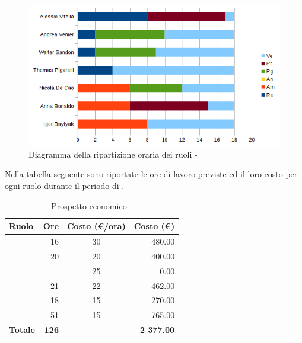 \documentclass[12pt,a4paper]{article}
\begin{document}
\begin{center}
	\begin{figure}[H]
		\centering
		\includegraphics[width=\textwidth]{../img/diagrammaBarreVerificaValidazioneRotazioneRuoli.png}
		\caption{Diagramma della ripartizione oraria dei ruoli - \FVV{}}
	\end{figure}
\end{center}

\newpage
{}
Nella tabella seguente sono riportate le ore di lavoro previste ed il loro costo per ogni ruolo durante il periodo di \FV.

\begin{table}[H]
	\begin{center}
		\begin{tabular}{l r c r}
			\toprule
			\textbf{Ruolo}	& \textbf{Ore} & \textbf{Costo (\euro/ora)}	& \textbf{Costo (\euro)} \\
			\midrule
			\midrule
			\RE{} & 16 & 30 & 480.00\\
			\midrule
			\AM{} & 20 & 20 & 400.00\\ 
			\midrule
			\AN{} & & 25 & 0.00\\ 
			\midrule
			\PG{} & 21 & 22 & 462.00\\ 
			\midrule
			\PR{} & 18 & 15 & 270.00\\ 
			\midrule
			\VR{} & 51 & 15 & 765.00\\ 
			\midrule
			\textbf{Totale} & \textbf{126} &  & \textbf{2 377.00}\\
			\bottomrule
		\end{tabular}
		\caption{Prospetto economico - \FVV{}}
	\end{center}
\end{table}
\end{document}

